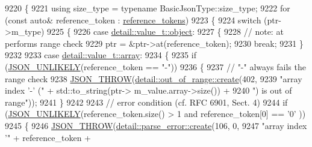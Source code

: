 \begin{DoxyCode}
9220     \{
9221         \textcolor{keyword}{using} size\_type = \textcolor{keyword}{typename} BasicJsonType::size\_type;
9222         \textcolor{keywordflow}{for} (\textcolor{keyword}{const} \textcolor{keyword}{auto}& reference\_token : \hyperlink{classnlohmann_1_1json__pointer_a07a990a6838de4f38ee9d881e7b9fd61}{reference\_tokens})
9223         \{
9224             \textcolor{keywordflow}{switch} (ptr->m\_type)
9225             \{
9226                 \textcolor{keywordflow}{case} \hyperlink{namespacenlohmann_1_1detail_a1ed8fc6239da25abcaf681d30ace4985aa8cfde6331bd59eb2ac96f8911c4b666}{detail::value\_t::object}:
9227                 \{
9228                     \textcolor{comment}{// note: at performs range check}
9229                     ptr = &ptr->at(reference\_token);
9230                     \textcolor{keywordflow}{break};
9231                 \}
9232 
9233                 \textcolor{keywordflow}{case} \hyperlink{namespacenlohmann_1_1detail_a1ed8fc6239da25abcaf681d30ace4985af1f713c9e000f5d3f280adbd124df4f5}{detail::value\_t::array}:
9234                 \{
9235                     \textcolor{keywordflow}{if} (\hyperlink{json_8hpp_ab77582407c64944e7db1ea95ab520253}{JSON\_UNLIKELY}(reference\_token == \textcolor{stringliteral}{"-"}))
9236                     \{
9237                         \textcolor{comment}{// "-" always fails the range check}
9238                         \hyperlink{json_8hpp_a6c274f6db2e65c1b66c7d41b06ad690f}{JSON\_THROW}(\hyperlink{classnlohmann_1_1detail_1_1out__of__range_a3f6d82a6f967c4728a1ec735a7867073}{detail::out\_of\_range::create}(402,
9239                                                                 \textcolor{stringliteral}{"array index '-' ("} + std::to\_string(ptr->
      m\_value.array->size()) +
9240                                                                 \textcolor{stringliteral}{") is out of range"}));
9241                     \}
9242 
9243                     \textcolor{comment}{// error condition (cf. RFC 6901, Sect. 4)}
9244                     \textcolor{keywordflow}{if} (\hyperlink{json_8hpp_ab77582407c64944e7db1ea95ab520253}{JSON\_UNLIKELY}(reference\_token.size() > 1 and reference\_token[0] == \textcolor{charliteral}{'0'}
      ))
9245                     \{
9246                         \hyperlink{json_8hpp_a6c274f6db2e65c1b66c7d41b06ad690f}{JSON\_THROW}(\hyperlink{classnlohmann_1_1detail_1_1parse__error_a9fd60ad6bce80fd99686ad332faefd37}{detail::parse\_error::create}(106, 0,
9247                                                                \textcolor{stringliteral}{"array index '"} + reference\_token +

\end{DoxyCode}
